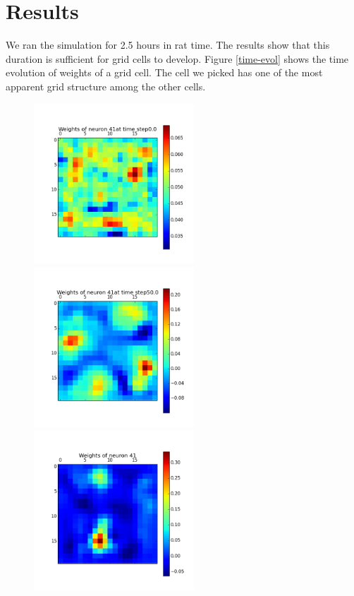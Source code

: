 \documentclass[a4paper, 12pt]{article}
\begin{document}
\section{Results}
We ran the simulation for 2.5 hours in rat time. The results show that this duration is sufficient for grid cells to develop. Figure \ref{time-evol} shows the time evolution of weights of a grid cell. The cell we picked has one of the most apparent grid structure among the other cells.

\begin{figure}[htbp]
\begin{minipage}[hbt]{0,49\textwidth}
        \centering
\includegraphics[width=6cm,height=6cm]{neurons/neuron_w_41_t_0.png}\\[10pt]
\includegraphics[width=6cm,height=6cm]{neurons/neuron_w_41_t_50.png} \\[10pt]
\includegraphics[width=6cm,height=6cm]{neurons/neuron_w_41.png}

\end{minipage}
\end{figure}
\end{document}
